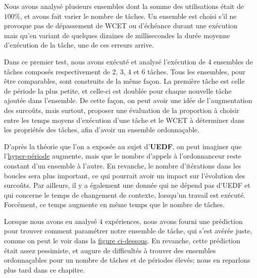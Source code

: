 	Nous avons analysé plusieurs ensembles dont la somme des utilisations était de $100\%$, et avons fait varier 
	le nombre de tâches. Un ensemble est choisi s'il ne provoque pas de dépassement de WCET ou d'échéance durant une exécution 
	mais qu'en variant de quelques dizaines de millisecondes la durée moyenne d'exécution de la tâche, une de ces erreurs arrive.\newline
	
	Dans ce premier test, nous avons exécuté et analysé l'exécution de $4$ ensembles de tâches composés respectivement de 
	$2$, $3$, $4$ et $6$ tâches. Tous les ensembles, pour être comparables, sont construits de la même façon. 
	La première tâche est celle de période la plus petite, et celle-ci est doublée pour chaque nouvelle tâche ajoutée dans 
	l'ensemble. De cette façon, on peut avoir une idée de l'augmentation des surcoûts, mais surtout, proposer 
	une évaluation de la proportion à choisir entre les temps moyens d'exécution d'une tâche et le WCET à déterminer 
	dans les propriétés des tâches, afin d'avoir un ensemble ordonnaçable. \newline
	
	D'après la théorie que l'on a exposée au sujet d'\textbf{UEDF}, on peut imaginer que l'\hyperref[hyperperiode]{hyper-période} augmente, 
	mais que le nombre d'appels à l'ordonnanceur reste constant d'un ensemble à l'autre. En revanche, 
	le nombre d'itérations dans les boucles sera plus important, ce qui pourrait avoir un impact sur l'évolution 
	des surcoûts.
	Par ailleurs, il y a également une donnée qui ne dépend pas d'UEDF et qui concerne le temps 
	de changement de contexte, lorsqu'un travail est exécuté. Forcément, ce temps augmente en 
	même temps que le nombre de tâches.\newline
	
	Lorsque nous avons eu analysé $4$ expériences, nous avons fourni une prédiction pour trouver comment paramétrer notre 
	ensemble de tâche, qui s'est avérée juste, comme on peut le voir dans la \hyperref[wcetevo]{figure ci-dessous}. 
	En revanche, cette prédiction était assez pessimiste, et augure de difficultés à trouver des ensembles 
	ordonnaçables pour un nombre de tâches et de périodes élevés; nous en reparlons plus tard dans ce chapitre.
	
